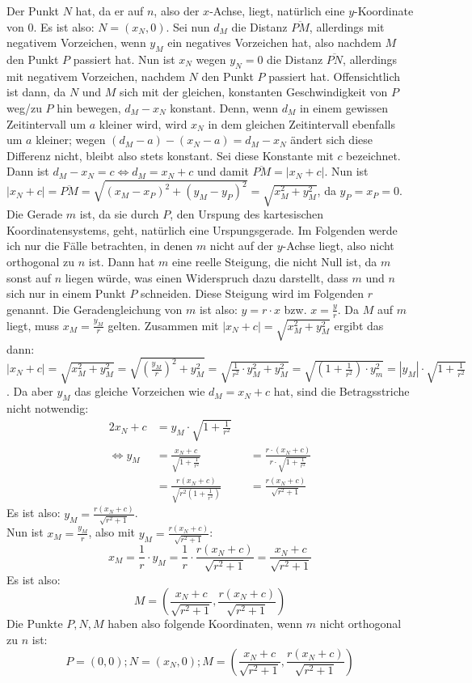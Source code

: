 Der Punkt $N$ hat, da er auf $n$, also der $x$-Achse, liegt, natürlich eine $y$-Koordinate von 0. Es ist also: 
$N=(x_N, 0)$. Sei nun $d_M$ die Distanz $\overline{PM}$, allerdings mit negativem Vorzeichen, wenn $y_M$ ein 
negatives Vorzeichen hat, also nachdem $M$ den Punkt $P$ passiert hat. Nun ist $x_N$ wegen $y_N=0$ die Distanz 
$\overline{PN}$, allerdings mit negativem Vorzeichen, nachdem $N$ den Punkt $P$ passiert hat. Offensichtlich ist 
dann, da $N$ und $M$ sich mit der gleichen, konstanten Geschwindigkeit von $P$ weg/zu $P$ hin bewegen, $d_M-x_N$ 
konstant. Denn, wenn $d_M$ in einem gewissen Zeitintervall um $a$ kleiner wird, wird $x_N$ in dem gleichen 
Zeitintervall ebenfalls um $a$  kleiner; wegen $(d_M-a)-(x_N-a)=d_M-x_N$ ändert sich diese Differenz nicht, bleibt 
also stets konstant. Sei diese Konstante mit $c$ bezeichnet. Dann ist $d_M-x_N=c\Leftrightarrow d_M=x_N+c$ und damit 
$\overline{PM}=|x_N+c|$. Nun ist $|x_N+c|=\overline{PM}=\sqrt{(x_M-x_P)^2+(y_M-y_P)^2}=\sqrt{x_M^2+y_M^2}$, da 
$y_P=x_P=0$. Die Gerade $m$ ist, da sie durch $P$, den Urspung des kartesischen Koordinatensystems, geht, natürlich 
eine Urspungsgerade. Im Folgenden werde ich nur die Fälle betrachten, in denen $m$ nicht auf der $y$-Achse liegt, 
also nicht orthogonal zu $n$ ist. Dann hat $m$ eine reelle Steigung, die nicht Null ist, da $m$ sonst auf $n$ liegen 
würde, was einen Widerspruch dazu darstellt, dass $m$ und $n$ sich nur in einem Punkt $P$ schneiden. Diese Steigung 
wird im Folgenden $r$ genannt. Die Geradengleichung von $m$ ist also: $y=r\cdot x$ bzw. $x=\frac{y}{r}$. Da $M$ auf 
$m$ liegt, muss $x_M=\frac{y_M}{r}$ gelten. Zusammen mit $|x_N+c|=\sqrt{x_M^2+y_M^2}$ ergibt das dann: $|x_N+c|
=\sqrt{x_M^2+y_M^2}=\sqrt{(\frac{y_M}{r})^2+y_M^2}=\sqrt{\frac{1}{r^2}\cdot y_M^2+y_M^2}=\sqrt{(1+\frac{1}{r^2})
\cdot y_m^2}=|y_M|\cdot\sqrt{1+\frac{1}{r^2}}$. Da aber $y_M$ das gleiche Vorzeichen wie $d_M=x_N+c$ hat, sind die 
Betragsstriche nicht notwendig:
\begin{alignat*}{2}
    x_N+c&=y_M\cdot\sqrt{1+\frac{1}{r^2}}&&\\
    \Leftrightarrow y_M&=\frac{x_N+c}{\sqrt{1+\frac{1}{r^2}}}&&=\frac{r\cdot (x_N+c)}{r\cdot\sqrt{1+\frac{1}{r^2}}}\\
    &=\frac{r(x_N+c)}{\sqrt{r^2\left(1+\frac{1}{r^2}\right)}}&&=\frac{r(x_N+c)}{\sqrt{r^2+1}}
\end{alignat*}
Es ist also: $y_M=\frac{r(x_N+c)}{\sqrt{r^2+1}}$.\\
Nun ist $x_M=\frac{y_M}{r}$, also mit $y_M=\frac{r(x_N+c)}{\sqrt{r^2+1}}$:
\[
    x_M=\frac{1}{r}\cdot y_M=\frac{1}{r}\cdot \frac{r(x_N+c)}{\sqrt{r^2+1}}=\frac{x_N+c}{\sqrt{r^2+1}}
\]
Es ist also:
\[
    M=\left( \frac{x_N+c}{\sqrt{r^2+1}} , \frac{r(x_N+c)}{\sqrt{r^2+1}} \right)
\]
Die Punkte $P, N, M$ haben also folgende Koordinaten, wenn $m$ nicht orthogonal zu $n$ ist:
\[
    P=(0, 0); N=(x_N, 0); M=\left( \frac{x_N+c}{\sqrt{r^2+1}} , \frac{r(x_N+c)}{\sqrt{r^2+1}} \right)
\]

